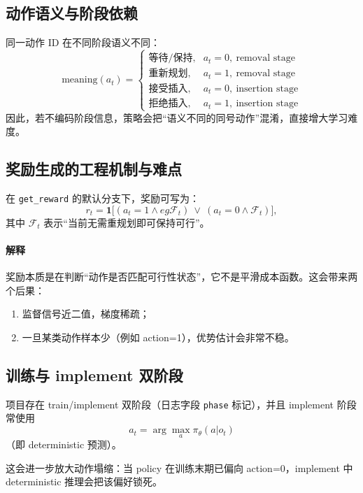 ﻿\documentclass[11pt,a4paper]{ctexart}
\begin{document}
\subsection{动作语义与阶段依赖}
同一动作 ID 在不同阶段语义不同：
\begin{equation}
\text{meaning}(a_t)=
\begin{cases}
\text{等待/保持}, & a_t=0,\ \text{removal stage}\\
\text{重新规划}, & a_t=1,\ \text{removal stage}\\
\text{接受插入}, & a_t=0,\ \text{insertion stage}\\
\text{拒绝插入}, & a_t=1,\ \text{insertion stage}
\end{cases}
\end{equation}
因此，若不编码阶段信息，策略会把“语义不同的同号动作”混淆，直接增大学习难度。

\subsection{奖励生成的工程机制与难点}
在 \texttt{get\_reward} 的默认分支下，奖励可写为：
\begin{equation}
r_t=\mathbf{1}\big[(a_t=1\land eg\mathcal{F}_t)\ \lor\ (a_t=0\land \mathcal{F}_t)\big],
\end{equation}
其中 $\mathcal{F}_t$ 表示“当前无需重规划即可保持可行”。

\paragraph{解释}
奖励本质是在判断“动作是否匹配可行性状态”，它不是平滑成本函数。这会带来两个后果：
\begin{enumerate}[leftmargin=*]
  \item 监督信号近二值，梯度稀疏；
  \item 一旦某类动作样本少（例如 action=1），优势估计会非常不稳。
\end{enumerate}

\subsection{训练与 implement 双阶段}
项目存在 train/implement 双阶段（日志字段 \texttt{phase} 标记），并且 implement 阶段常使用
\begin{equation}
a_t=\arg\max_a\pi_\theta(a|o_t)
\end{equation}
（即 deterministic 预测）。

这会进一步放大动作塌缩：当 policy 在训练末期已偏向 action=0，implement 中 deterministic 推理会把该偏好锁死。
\end{document}
